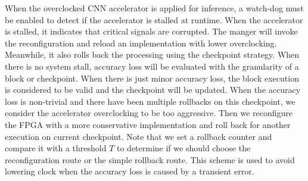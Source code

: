 When the overclocked CNN accelerator is applied for inference, 
a watch-dog must be enabled to detect if the accelerator is stalled 
at runtime. When the accelerator is stalled, it indicates that critical 
signals are corrupted. The manger will invoke the reconfiguration 
and reload an implementation with lower overclocking. Meanwhile, 
it also rolls back the processing using the checkpoint strategy. 
When there is no system stall, accuracy loss will be evaluated 
with the granularity of a block or checkpoint. 
When there is just minor accuracy loss, the block execution is 
considered to be valid and the checkpoint will 
be updated. When the accuracy loss is non-trivial and there have been multiple rollbacks 
on this checkpoint, we consider the accelerator overclocking to be too aggressive.
Then we reconfigure the FPGA with a more conservative implementation 
and roll back for another execution on current checkpoint.
Note that we set a rollback counter and compare it with a threshold $T$ 
to determine if we should choose the reconfiguration route or the simple rollback route.
This scheme is used to avoid lowering clock when the accuracy loss is 
caused by a transient error.



